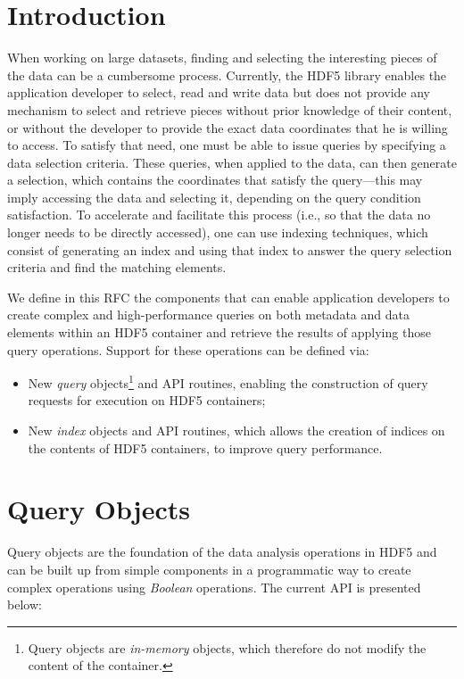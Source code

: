 \section{Introduction}
When working on large datasets, finding and selecting the interesting pieces of
the data can be a cumbersome process. Currently, the HDF5 library enables the 
application developer to select, read and write data but does not provide any 
mechanism to select and retrieve pieces without prior knowledge of their
content, or without the developer to provide the exact data coordinates that
he is willing to access. To satisfy that need, one must be able
to issue queries by specifying a data selection criteria. These queries,
when applied to the data, can then generate a selection, which contains the coordinates
that satisfy the query---this may imply accessing the data and selecting it,
depending on the query condition satisfaction. To accelerate and facilitate this
process (i.e., so that the data no longer needs to be directly accessed), one can
use indexing techniques, which consist of generating an index and using that index
to answer the query selection criteria and find the matching elements.

We define in this RFC the components that can enable application developers to
create complex and high-performance queries on both metadata and data elements
within an HDF5 container and retrieve the results of applying those query
operations. Support for these operations can be defined via:
\begin{itemize}
\item New \textit{query} objects\footnote{Query objects are
\textit{in-memory} objects, which therefore do not modify the content of the
container.\label{fn:object}} and API routines, enabling the construction of
query requests for execution on HDF5 containers;
\item New \textit{index} objects and API routines, which allows the creation of
indices on the contents of HDF5 containers, to improve query performance.
\end{itemize}

\section{Query Objects}
Query objects are the foundation of the data analysis operations in HDF5 and
can be built up from simple components in a programmatic way to create complex
operations using \textit{Boolean} operations. The current API is presented
below:

